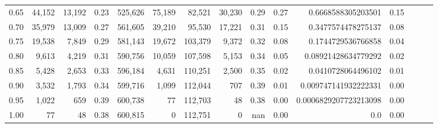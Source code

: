 \begin{tabular}{rrrrrrrrrrrrrrr}
0.65 &  44,152 &  13,192 &  0.23 &  525,626 &   75,189 &   82,521 &   30,230 &  0.29 &  0.27 &     0.6668588305203501 &      0.15 \\
0.70 &  35,979 &  13,009 &  0.27 &  561,605 &   39,210 &   95,530 &   17,221 &  0.31 &  0.15 &     0.3477574478275137 &      0.08 \\
0.75 &  19,538 &   7,849 &  0.29 &  581,143 &   19,672 &  103,379 &    9,372 &  0.32 &  0.08 &     0.1744729536766858 &      0.04 \\
0.80 &   9,613 &   4,219 &  0.31 &  590,756 &   10,059 &  107,598 &    5,153 &  0.34 &  0.05 &    0.08921428634779292 &      0.02 \\
0.85 &   5,428 &   2,653 &  0.33 &  596,184 &    4,631 &  110,251 &    2,500 &  0.35 &  0.02 &     0.0410728064496102 &      0.01 \\
0.90 &   3,532 &   1,793 &  0.34 &  599,716 &    1,099 &  112,044 &      707 &  0.39 &  0.01 &   0.009747141932222331 &      0.00 \\
0.95 &   1,022 &     659 &  0.39 &  600,738 &       77 &  112,703 &       48 &  0.38 &  0.00 &  0.0006829207723213098 &      0.00 \\
1.00 &      77 &      48 &  0.38 &  600,815 &        0 &  112,751 &        0 &   nan &  0.00 &                    0.0 &      0.00 \\
\bottomrule
\end{tabular}

